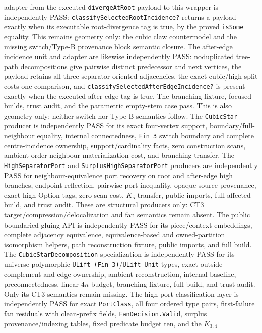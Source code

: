\documentclass[11pt]{article}
\begin{document}
adapter from the executed \texttt{divergeAtRoot} payload to this wrapper is
independently PASS: \texttt{classifySelectedRootIncidence?} returns a payload
exactly when its executable root-divergence tag is true, by the proved
\texttt{isSome} equality.  This remains geometry only: the cubic claw
countermodel and the missing switch/Type-B provenance block semantic closure.
The after-edge incidence unit and adapter are likewise independently PASS:
noduplicated tree-path decompositions give pairwise distinct predecessor and
next vertices, the payload retains all three separator-oriented adjacencies,
the exact cubic/high split costs one comparison, and
\texttt{classifySelectedAfterEdgeIncidence?} is present exactly when the
executed after-edge tag is true.  The branching fixture, focused builds, trust
audit, and the parametric empty-stem case pass.  This is also geometry only;
neither switch nor Type-B semantics follow.
The \texttt{CubicStar} producer is independently PASS for its exact
four-vertex support, boundary/full-neighbour equality, internal connectedness,
\texttt{Fin 3} switch boundary and complete centre-incidence ownership,
support/cardinality facts, zero construction scans, ambient-order neighbour
materialization cost, and branching transfer.  The
\texttt{HighSeparatorPort} and \texttt{SurplusHighSeparatorPort} producers are
independently PASS for neighbour-equivalence port recovery on root and
after-edge high branches, endpoint reflection, pairwise port inequality,
opaque source provenance, exact high Option tags, zero scan cost, $K_5$
transfer, public imports, full affected build, and trust audit.  These are
structural producers only: CT3 target/compression/delocalization and fan
semantics remain absent.  The public boundaried-gluing API is independently
PASS for its piece/context embeddings, complete adjacency equivalence,
equivalence-based and owned-partition isomorphism helpers, path reconstruction
fixture, public imports, and full build.  The
\texttt{CubicStarDecomposition} specialization is independently PASS for its
universe-polymorphic \texttt{ULift (Fin 3)}/\texttt{ULift Unit} types, exact
outside complement and edge ownership, ambient reconstruction, internal
baseline, preconnectedness, linear $4n$ budget, branching fixture, full build,
and trust audit.  Only its CT3 semantics remain missing.  The high-port
classification layer is independently PASS for exact
\texttt{PortClass}, all four ordered type pairs, first-failure fan residuals
with clean-prefix fields, \texttt{FanDecision.Valid}, surplus
provenance/indexing tables, fixed predicate budget ten, and the $K_{3,4}$
\end{document}
